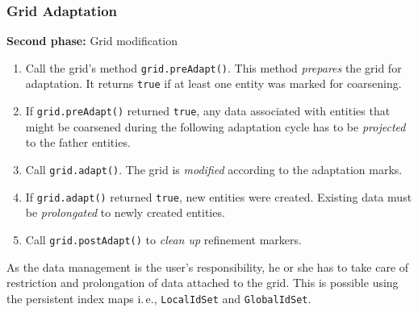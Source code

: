 \begin{frame}
  \frametitle<presentation>{Grid Adaptation} 

  {\bf Second phase:} {Grid modification}
  \begin{enumerate}
    \item Call the grid's method \lstinline{grid.preAdapt()}. This method \emph{prepares}
      the grid for adaptation. It returns \lstinline{true} if at least one entity was
      marked for coarsening.

      \pause

    \item If \lstinline{grid.preAdapt()} returned \lstinline{true}, any data associated with
      entities that might be coarsened during the following adaptation
      cycle has to be \emph{projected} to the father entities.

      \pause

    \item Call \lstinline{grid.adapt()}. The grid is \emph{modified} according to the
      adaptation marks.

      \pause

    \item If \lstinline{grid.adapt()} returned \lstinline{true}, new entities were created.
      Existing data must be \emph{prolongated} to newly created entities.

      \pause

    \item Call \lstinline{grid.postAdapt()} to \emph{clean up} refinement markers.
  \end{enumerate}

  \pause

  As the data management is the user's responsibility, he or she has to
  take care of restriction and prolongation of data attached to the grid. 
  This is possible using the persistent index maps 
  i.\,e., \lstinline{LocalIdSet} and \lstinline{GlobalIdSet}.
\end{frame}

